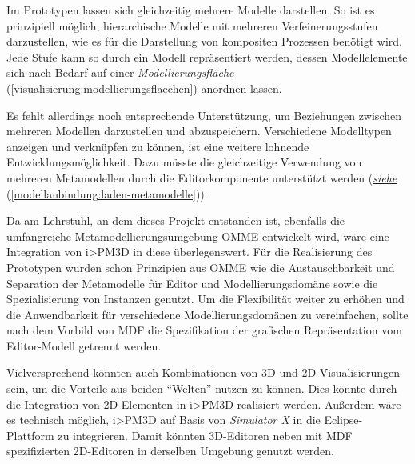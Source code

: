 \documentclass[a4paper,10pt]{sphinxmanual}
\begin{document}
Im Prototypen lassen sich gleichzeitig mehrere Modelle darstellen.
So ist es prinzipiell möglich, hierarchische Modelle mit mehreren Verfeinerungsstufen darzustellen, wie es für die Darstellung von kompositen Prozessen benötigt wird.
Jede Stufe kann so durch ein Modell repräsentiert werden, dessen Modellelemente sich nach Bedarf auf einer {\hyperref[visualisierung:modellierungsflaechen]{\emph{Modellierungsfläche}}} (\autoref*{visualisierung:modellierungsflaechen}) anordnen lassen.

Es fehlt allerdings noch entsprechende Unterstützung, um Beziehungen zwischen mehreren Modellen darzustellen und abzuspeichern.
Verschiedene Modelltypen anzeigen und verknüpfen zu können, ist eine weitere lohnende Entwicklungsmöglichkeit.
Dazu müsste die gleichzeitige Verwendung von mehreren Metamodellen durch die Editorkomponente unterstützt werden ({\hyperref[modellanbindung:laden-metamodelle]{\emph{siehe}}} (\autoref*{modellanbindung:laden-metamodelle})).

Da am Lehrstuhl, an dem dieses Projekt entstanden ist, ebenfalls die umfangreiche Metamodellierungsumgebung OMME entwickelt wird, wäre eine Integration von i\textgreater{}PM3D in diese überlegenswert.
Für die Realisierung des Prototypen wurden schon Prinzipien aus OMME wie die Austauschbarkeit und Separation der Metamodelle für Editor und Modellierungsdomäne sowie die Spezialisierung von Instanzen genutzt.
Um die Flexibilität weiter zu erhöhen und die Anwendbarkeit für verschiedene Modellierungsdomänen zu vereinfachen, sollte nach dem Vorbild von MDF die Spezifikation der grafischen Repräsentation vom Editor-Modell getrennt werden.

Vielversprechend könnten auch Kombinationen von 3D und 2D-Visualisierungen sein, um die Vorteile aus beiden "`Welten"' nutzen zu können.
Dies könnte durch die Integration von 2D-Elementen in i\textgreater{}PM3D realisiert werden.
Außerdem wäre es technisch möglich, i\textgreater{}PM3D auf Basis von \emph{Simulator X} in die Eclipse-Plattform zu integrieren.
Damit könnten 3D-Editoren neben mit MDF spezifizierten 2D-Editoren in derselben Umgebung genutzt werden.
\end{document}
